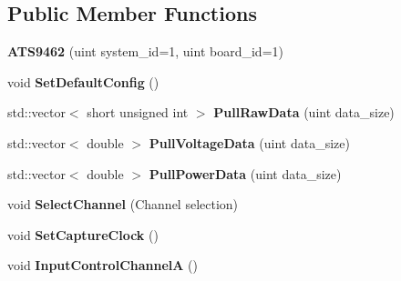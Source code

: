 \subsection*{Public Member Functions}
\begin{DoxyCompactItemize}
\item 
{\bfseries A\+T\+S9462} (uint system\+\_\+id=1, uint board\+\_\+id=1)\hypertarget{classalazar_1_1_a_t_s9462_a3c9661f8a645ad7decec5a88d000ac4b}{}\label{classalazar_1_1_a_t_s9462_a3c9661f8a645ad7decec5a88d000ac4b}

\item 
void {\bfseries Set\+Default\+Config} ()\hypertarget{classalazar_1_1_a_t_s9462_a105294c25a46cd9ccdefde67f939ebd2}{}\label{classalazar_1_1_a_t_s9462_a105294c25a46cd9ccdefde67f939ebd2}

\item 
std\+::vector$<$ short unsigned int $>$ {\bfseries Pull\+Raw\+Data} (uint data\+\_\+size)\hypertarget{classalazar_1_1_a_t_s9462_a36c812b7947f0747e956be07a1abc06b}{}\label{classalazar_1_1_a_t_s9462_a36c812b7947f0747e956be07a1abc06b}

\item 
std\+::vector$<$ double $>$ {\bfseries Pull\+Voltage\+Data} (uint data\+\_\+size)\hypertarget{classalazar_1_1_a_t_s9462_ab5b939ed5c26c0090167ba1a362410e9}{}\label{classalazar_1_1_a_t_s9462_ab5b939ed5c26c0090167ba1a362410e9}

\item 
std\+::vector$<$ double $>$ {\bfseries Pull\+Power\+Data} (uint data\+\_\+size)\hypertarget{classalazar_1_1_a_t_s9462_af3b77c6e5fec6305d86ea2e51079fca5}{}\label{classalazar_1_1_a_t_s9462_af3b77c6e5fec6305d86ea2e51079fca5}

\item 
void {\bfseries Select\+Channel} (Channel selection)\hypertarget{classalazar_1_1_a_t_s9462_a14212eb00bd058e6544e24538a77f485}{}\label{classalazar_1_1_a_t_s9462_a14212eb00bd058e6544e24538a77f485}

\item 
void {\bfseries Set\+Capture\+Clock} ()\hypertarget{classalazar_1_1_a_t_s9462_abff5593d1a4186e575b440cb48a61130}{}\label{classalazar_1_1_a_t_s9462_abff5593d1a4186e575b440cb48a61130}

\item 
void {\bfseries Input\+Control\+ChannelA} ()\hypertarget{classalazar_1_1_a_t_s9462_a5eab01e620a5eb08aaa9a1109c55b130}{}\label{classalazar_1_1_a_t_s9462_a5eab01e620a5eb08aaa9a1109c55b130}


\end{DoxyCompactItemize}
